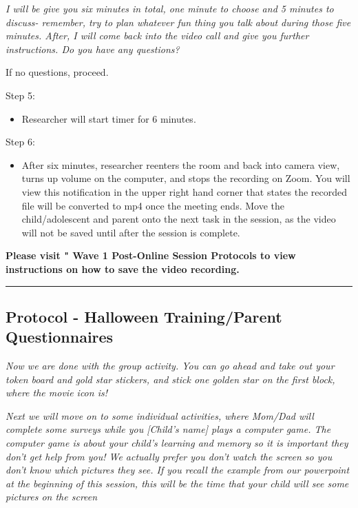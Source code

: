 \documentclass[]{book}
\providecommand{\tightlist}{%
  \setlength{\itemsep}{0pt}\setlength{\parskip}{0pt}}
\begin{document}
\emph{I will be give you six minutes in total, one minute to choose and 5 minutes to discuss- remember, try to plan whatever fun thing you talk about during those five minutes. After, I will come back into the video call and give you further instructions. Do you have any questions?}

If no questions, proceed.

Step 5:

\begin{itemize}
\tightlist
\item
  Researcher will start timer for 6 minutes.
\end{itemize}

Step 6:

\begin{itemize}
\tightlist
\item
  After six minutes, researcher reenters the room and back into camera view, turns up volume on the computer, and stops the recording on Zoom. You will view this notification in the upper right hand corner that states the recorded file will be converted to mp4 once the meeting ends. Move the child/adolescent and parent onto the next task in the session, as the video will not be saved until after the session is complete.
\end{itemize}

\textbf{Please visit " Wave 1 Post-Online Session Protocols to view instructions on how to save the video recording.}

\begin{center}\rule{0.5\linewidth}{0.5pt}\end{center}

\hypertarget{protocol---halloween-trainingparent-questionnaires-1}{%
\subsection{Protocol - Halloween Training/Parent Questionnaires}\label{protocol---halloween-trainingparent-questionnaires-1}}

\emph{Now we are done with the group activity. You can go ahead and take out your token board and gold star stickers, and stick one golden star on the first block, where the movie icon is!}

\emph{Next we will move on to some individual activities, where Mom/Dad will complete some surveys while you {[}Child's name{]} plays a computer game. The computer game is about your child's learning and memory so it is important they don't get help from you! We actually prefer you don't watch the screen so you don't know which pictures they see. If you recall the example from our powerpoint at the beginning of this session, this will be the time that your child will see some pictures on the screen}
\end{document}

